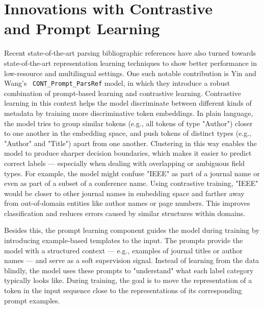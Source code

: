 \section[Innovations with Contrastive and Prompt Learning]{Innovations with Contrastive\\ and Prompt Learning}
Recent state-of-the-art parsing bibliographic references have also turned towards state-of-the-art representation learning techniques to show better performance in low-resource and multilingual settings. One such notable contribution is Yin and Wang's~\cite{contrastive} \texttt{CONT\_Prompt\_ParsRef} model, in which they introduce a robust combination of prompt-based learning and contrastive learning.
Contrastive learning in this context helps the model discriminate between different kinds of metadata by training more discriminative token embeddings. In plain language, the model tries to group similar tokens (e.g., all tokens of type "Author") closer to one another in the embedding space, and push tokens of distinct types (e.g., "Author" and "Title") apart from one another. Clustering in this way enables the model to produce sharper decision boundaries, which makes it easier to predict correct labels — especially when dealing with overlapping or ambiguous field types.
For example, the model might confuse "IEEE" as part of a journal name or even as part of a subset of a conference name. Using contrastive training, "IEEE" would be closer to other journal names in embedding space and farther away from out-of-domain entities like author names or page numbers. This improves classification and reduces errors caused by similar structures within domains.

Besides this, the prompt learning component guides the model during training by introducing example-based templates to the input. The prompts provide the model with a structured context — e.g., examples of journal titles or author names — and serve as a soft supervision signal. Instead of learning from the data blindly, the model uses these prompts to "understand" what each label category typically looks like. During training, the goal is to move the representation of a token in the input sequence close to the representations of its corresponding prompt examples.

